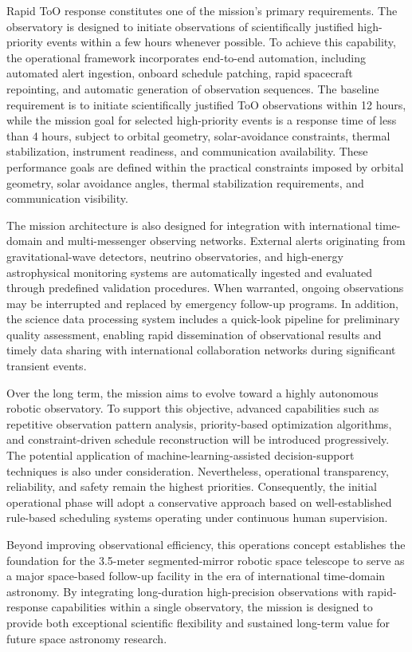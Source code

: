 Rapid ToO response constitutes one of the mission's primary requirements. The observatory is designed to initiate observations of scientifically justified high-priority events within a few hours whenever possible. To achieve this capability, the operational framework incorporates end-to-end automation, including automated alert ingestion, onboard schedule patching, rapid spacecraft repointing, and automatic generation of observation sequences. 
The baseline requirement is to initiate scientifically justified ToO observations within 12 hours, while the mission goal for selected high-priority events is a response time of less than 4 hours, subject to orbital geometry, solar-avoidance constraints, thermal stabilization, instrument readiness, and communication availability.
These performance goals are defined within the practical constraints imposed by orbital geometry, solar avoidance angles, thermal stabilization requirements, and communication visibility.

The mission architecture is also designed for integration with international time-domain and multi-messenger observing networks. External alerts originating from gravitational-wave detectors, neutrino observatories, and high-energy astrophysical monitoring systems are automatically ingested and evaluated through predefined validation procedures. When warranted, ongoing observations may be interrupted and replaced by emergency follow-up programs. In addition, the science data processing system includes a quick-look pipeline for preliminary quality assessment, enabling rapid dissemination of observational results and timely data sharing with international collaboration networks during significant transient events.

Over the long term, the mission aims to evolve toward a highly autonomous robotic observatory. To support this objective, advanced capabilities such as repetitive observation pattern analysis, priority-based optimization algorithms, and constraint-driven schedule reconstruction will be introduced progressively. The potential application of machine-learning-assisted decision-support techniques is also under consideration. Nevertheless, operational transparency, reliability, and safety remain the highest priorities. Consequently, the initial operational phase will adopt a conservative approach based on well-established rule-based scheduling systems operating under continuous human supervision.

Beyond improving observational efficiency, this operations concept establishes the foundation for the 3.5-meter segmented-mirror robotic space telescope to serve as a major space-based follow-up facility in the era of international time-domain astronomy. By integrating long-duration high-precision observations with rapid-response capabilities within a single observatory, the mission is designed to provide both exceptional scientific flexibility and sustained long-term value for future space astronomy research.

